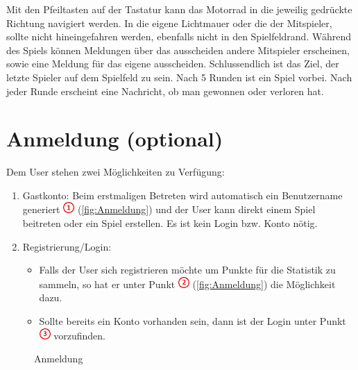 \documentclass[11pt,ngerman]{article}
\begin{document}
    \noindent Mit den Pfeiltasten auf der Tastatur kann das Motorrad in die jeweilig gedrückte Richtung navigiert werden.
    In die eigene Lichtmauer oder die der Mitspieler, sollte nicht hineingefahren werden, ebenfalls nicht in den Spielfeldrand. \newline
    \newline
    Während des Spiels können Meldungen über das ausscheiden andere Mitspieler erscheinen, sowie eine Meldung für das eigene ausscheiden. \newline
    \newline
    Schlussendlich ist das Ziel, der letzte Spieler auf dem Spielfeld zu sein. Nach 5 Runden ist ein Spiel vorbei. Nach jeder Runde erscheint eine Nachricht, ob man gewonnen oder verloren hat.

     \section{Anmeldung (optional)}
    Dem User stehen zwei Möglichkeiten zu Verfügung:
    \begin{enumerate}
        \item Gastkonto: Beim erstmaligen Betreten wird automatisch ein Benutzername generiert \includegraphics{figures/1.png} (\autoref{fig:Anmeldung}) und der User kann direkt einem Spiel beitreten oder ein Spiel erstellen. Es ist kein Login bzw. Konto nötig.
        \item Registrierung/Login:
        \begin{itemize}
            \item  Falls der User sich registrieren möchte um Punkte für die Statistik zu sammeln, so hat er unter Punkt \includegraphics{figures/2.png} (\autoref{fig:Anmeldung}) die Möglichkeit dazu.
            \item Sollte bereits ein Konto vorhanden sein, dann ist der Login unter Punkt \includegraphics{figures/3.png} vorzufinden.
        \end{itemize}
    \end{enumerate}

    \begin{figure}[H]
    	\centering
    	\caption{Anmeldung}
    	\label{fig:Anmeldung}
    \end{figure}
\end{document}
